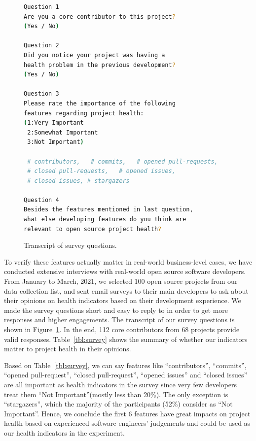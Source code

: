 \documentclass[smallextended]{svjour3}
\newcommand{\fig}[1]{Figure~\ref{fig:#1}}
\newcommand{\respto}[1]{
\fcolorbox{black}{black!15}{%
\label{resp:#1}%
\bf\scriptsize R{#1}}}
\newcommand{\BLUE}{\color{blue}}
\newcommand{\BLACK}{\color{black}}
\begin{document}
\begin{figure}
\centering
\scriptsize 
\vspace{-0.8cm}
\begin{center}
\begin{lstlisting}[language=bash,linewidth=6cm,frame=single,numbers=none,keywords=none]
Question 1
Are you a core contributor to this project? 
(Yes / No)

Question 2
Did you notice your project was having a 
health problem in the previous development? 
(Yes / No)

Question 3
Please rate the importance of the following 
features regarding project health: 
(1:Very Important
 2:Somewhat Important
 3:Not Important)
 
 # contributors,   # commits,   # opened pull-requests, 
 # closed pull-requests,   # opened issues, 
 # closed issues, # stargazers

Question 4
Besides the features mentioned in last question,
what else developing features do you think are 
relevant to open source project health?
\end{lstlisting} 
\end{center}
\vspace{-0.5cm}
\caption{Transcript of survey questions.}
\label{fig:transcript} 
\vspace{-0.5cm}
\end{figure}


\BLUE

\respto{4B1} To verify these features actually matter in real-world business-level cases, we have conducted extensive interviews with real-world open source software developers. From January to March, 2021, we selected 100 open source projects from our data collection list, and sent email surveys to their main developers to ask about their opinions on health indicators based on their development experience. We made the survey questions short and easy to reply to in order to get more responses and higher engagements. The transcript of our survey questions is  shown in \fig{transcript}.
In the end, 112 core contributors
from 68 projects provide valid responses. Table~\ref{tbl:survey} shows the summary of whether our indicators matter to project health in their opinions.  


\respto{2E} Based on Table~\ref{tbl:survey}, we can say features like ``contributors'', ``commits'', ``opened pull-request'', ``closed pull-request'', ``opened issues'' and ``closed issues'' are all important as health indicators in the survey since very few developers treat them ``Not Important''(mostly less than 20\%). The only exception is ``stargazers'', which the majority of the participants (52\%) consider as ``Not Important''. Hence, we conclude the first 6 features have great impacts on project health based on experienced software engineers' judgements and could be used as our health indicators in the experiment. 
\BLACK
\end{document}
